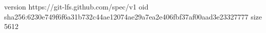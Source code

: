 version https://git-lfs.github.com/spec/v1
oid sha256:6230e749f6f6a31b732c44ae12074ae29a7ea2e406fbf37af00aad3e23327777
size 5612
